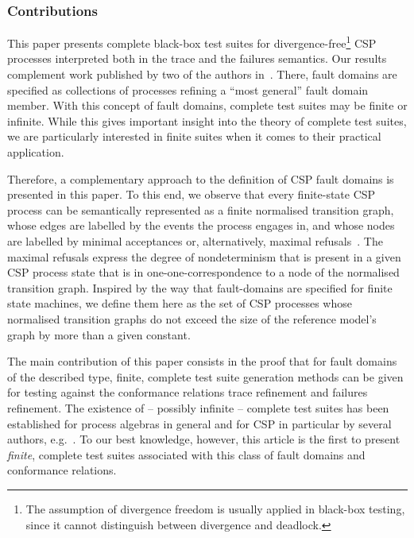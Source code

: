 \subsubsection*{Contributions}

This paper presents complete black-box test suites for divergence-free\footnote{The assumption of divergence freedom is usually applied in black-box testing, since it cannot distinguish between divergence and deadlock.} CSP processes interpreted 
both in the trace   and the failures semantics.  
Our results complement work published by two of the authors
in~\cite{DBLP:conf/pts/CavalcantiS17}. There, fault domains are specified as
collections of processes refining a  ``most general'' fault domain member.
With this concept of fault domains, complete test suites may be finite or
infinite. While this gives important insight into the theory of complete test
suites, we are particularly interested in finite suites when it comes to
their practical application.

Therefore,  a complementary approach to the definition of CSP fault
domains is presented in this paper. To this end, we observe that every finite-state CSP
process can be semantically represented as a finite normalised transition
graph, whose edges are labelled by the events the process engages in, and
whose nodes are labelled by minimal acceptances or, alternatively, maximal
refusals~\cite{Roscoe:1994:CME:197600}. The maximal refusals  express the
degree of nondeterminism that is present in a given CSP process state that is
in one-one-correspondence to a node of the normalised transition graph.
Inspired by the way that fault-domains are specified for finite state
machines, we define them here as the set of CSP processes whose
normalised transition graphs do not exceed the size of the reference model's
graph by more than a given constant.

The main contribution of this paper consists in the proof that 
for fault domains of the described type, finite, complete
    test suite generation methods can be given for testing against the conformance relations 
    trace refinement and failures refinement. 
The existence of -- possibly infinite -- complete test suites has been established for process algebras in general and  for CSP in particular by several authors, 
e.g.~\cite{Hennessy:1988:ATP:50497,Schneider:1995:OST:203471.203475,DBLP:conf/fm/PeleskaS96,peleska1997a,DBLP:conf/pts/CavalcantiS17}. To our best knowledge, however, this article is the first to present {\it finite}, complete test suites associated with this class of fault domains and conformance relations.

